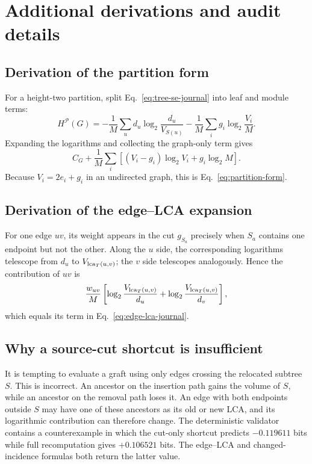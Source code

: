 \section{Additional derivations and audit details}\label{app:details}

\subsection{Derivation of the partition form}

For a height-two partition, split Eq.~\eqref{eq:tree-se-journal} into leaf and
module terms:
\[
H^{\mathcal P}(G)=
-\frac{1}{M}\sum_ud_u\log_2\frac{d_u}{V_{S(u)}}
-\frac{1}{M}\sum_i g_i\log_2\frac{V_i}{M}.
\]
Expanding the logarithms and collecting the graph-only term gives
\[
C_G+\frac{1}{M}\sum_i[(V_i-g_i)\log_2V_i+g_i\log_2M].
\]
Because $V_i=2e_i+g_i$ in an undirected graph, this is
Eq.~\eqref{eq:partition-form}.

\subsection{Derivation of the edge--LCA expansion}

For one edge $uv$, its weight appears in the cut $g_{S_a}$ precisely when
$S_a$ contains one endpoint but not the other. Along the $u$ side, the
corresponding logarithms telescope from $d_u$ to
$V_{\operatorname{lca}_T(u,v)}$; the $v$ side telescopes analogously. Hence the contribution
of $uv$ is
\[
\frac{w_{uv}}{M}\left[
\log_2\frac{V_{\operatorname{lca}_T(u,v)}}{d_u}+
\log_2\frac{V_{\operatorname{lca}_T(u,v)}}{d_v}\right],
\]
which equals its term in Eq.~\eqref{eq:edge-lca-journal}.

\subsection{Why a source-cut shortcut is insufficient}

It is tempting to evaluate a graft using only edges crossing the relocated
subtree $S$. This is incorrect. An ancestor on the insertion path gains the
volume of $S$, while an ancestor on the removal path loses it. An edge with
both endpoints outside $S$ may have one of these ancestors as its old or new
LCA, and its logarithmic contribution can therefore change. The deterministic
validator contains a counterexample in which the cut-only shortcut predicts
$-0.119611$ bits while full recomputation gives $+0.106521$ bits. The
edge--LCA and changed-incidence formulas both return the latter value.

